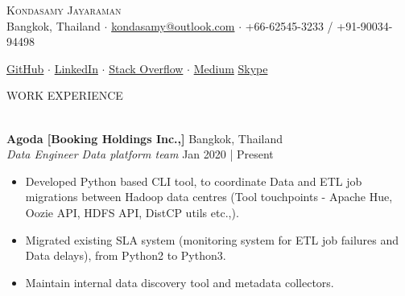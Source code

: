 \documentclass[a4paper]{article}
\newcommand{\lineunder} {
    \vspace*{-8pt} \\
    \hspace*{-18pt} \hrulefill \\
}
\newcommand{\header} [1] {
    {\hspace*{-18pt}\vspace*{6pt} \textsc{#1}}
    \vspace*{-6pt} \lineunder
}
\begin{document}
\vspace*{-50pt}

    

\vspace*{-12pt}
\begin{center}
	{\Huge \scshape {Kondasamy Jayaraman}}\\
	\vspace{1mm}
	Bangkok, Thailand $\cdot$ 
	\faEnvelope \hspace{.5mm} \href{mailto:kondasamy@outlook.com}{kondasamy@outlook.com} $\cdot$ \faMobile \hspace{.5mm} +66-62545-3233 / +91-90034-94498
	
	\faGithub \hspace{.5mm} \href{https://github.com/Kondasamy}{GitHub} $\cdot$
	\faLinkedin \hspace{.5mm} \href{https://www.linkedin.com/in/kondasamy/}{LinkedIn} $\cdot$
	\faStackOverflow \hspace{.5mm} \href{https://stackoverflow.com/users/2094099/kondasamy-jayaraman}{Stack Overflow} $\cdot$
	\faMedium \hspace{.5mm} \href{https://medium.com/@kondasamy}{Medium}
	\faSkype \hspace{.5mm} \href{https://join.skype.com/invite/n0IMYwGkGwQ1}{Skype}\\
\end{center}

\header{WORK EXPERIENCE}
\vspace{1mm}

\textbf{Agoda [Booking Holdings Inc.,]} \hfill Bangkok, Thailand\\
\textit{Data Engineer \textbar{} Data platform team} \hfill Jan 2020 | Present\\
\vspace{-1.5mm}
\begin{itemize} \setlength\itemsep{-0.3em}
    \item Developed Python based CLI tool, to coordinate Data and ETL job migrations between Hadoop data centres (Tool touchpoints - Apache Hue, Oozie API, HDFS API, DistCP utils etc.,).
    \item Migrated existing SLA system (monitoring system for ETL job failures and Data delays), from Python2 to Python3.
    \item Maintain internal data discovery tool and metadata collectors.
\end{itemize}
\end{document}
